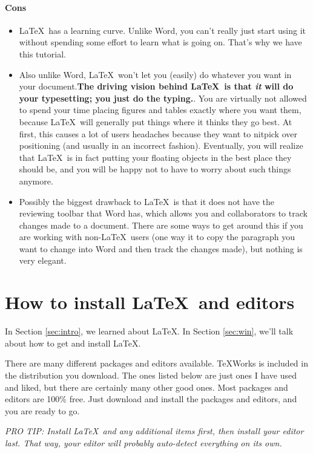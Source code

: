 \documentclass[12pt]{article}
\begin{document}
\paragraph{Cons} 
\begin{itemize}
	\item \LaTeX\ has a learning curve. Unlike Word, you can't really just start using it without spending some effort to learn what is going on. That's why we have this tutorial.
	\item Also unlike Word, \LaTeX\ won't let you (easily) do whatever you want in your document.\textbf{The driving vision behind \LaTeX\ is that \textit{it} will do your typesetting; you just do the typing.}. You are virtually not allowed to spend your time placing figures and tables exactly where you want them, because \LaTeX\ will generally put things where it thinks they go best. At first, this causes a lot of users headaches because they want to nitpick over positioning (and usually in an incorrect fashion). Eventually, you will realize that \LaTeX\ is in fact putting your floating objects in the best place they should be, and you will be happy not to have to worry about such things anymore.
	\item Possibly the biggest drawback to \LaTeX\ is that it does not have the reviewing toolbar that Word has, which allows you and collaborators to track changes made to a document. There are some ways to get around this if you are working with non-\LaTeX\ users (one way it to copy the paragraph you want to change into Word and then track the changes made), but nothing is very elegant.
\end{itemize}  

 
\section{How to install \LaTeX \ and editors}
In Section \ref{sec:intro}, we learned about \LaTeX. In Section \ref{sec:win}, we'll talk about how to get and install \LaTeX.

There are many different packages and editors available. TeXWorks is included in the distribution you download. The ones listed below are just ones I have used and liked, but there are certainly many other good ones. Most packages and editors are 100\% free. Just download and install the packages and editors, and you are ready to go.

\textit{PRO TIP: Install \LaTeX\ and any additional items first, then install your editor last. That way, your editor will probably auto-detect everything on its own.}
\end{document}
